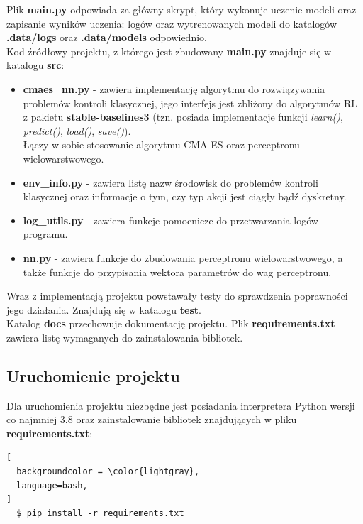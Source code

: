 \documentclass[12pt,a4paper]{article}
\begin{document}
Plik \textbf{main.py} odpowiada za główny skrypt, który wykonuje uczenie
modeli oraz zapisanie wyników uczenia: logów oraz wytrenowanych modeli
do katalogów \textbf{.data/logs} oraz \textbf{.data/models} odpowiednio. \\

Kod źródłowy projektu, z którego jest zbudowany \textbf{main.py} znajduje się
w katalogu \textbf{src}:
\begin{itemize}
  \item \textbf{cmaes\_nn.py} - zawiera implementację algorytmu do rozwiązywania
        problemów kontroli klasycznej, jego interfejs jest zbliżony
        do algorytmów RL z pakietu \textbf{stable-baselines3}
        (tzn. posiada implementacje funkcji \emph{learn()}, \emph{predict()},
        \emph{load()}, \emph{save()}). \\
        Łączy w sobie stosowanie algorytmu CMA-ES oraz perceptronu wielowarstwowego.

  \item \textbf{env\_info.py} - zawiera listę nazw środowisk do problemów kontroli
        klasycznej oraz informacje o tym, czy typ akcji jest ciągły bądź dyskretny.

  \item \textbf{log\_utils.py} - zawiera funkcje pomocnicze do przetwarzania
        logów programu.

  \item \textbf{nn.py} - zawiera funkcje do zbudowania perceptronu
        wielowarstwowego, a także funkcje do przypisania wektora parametrów
        do wag perceptronu.
\end{itemize}

Wraz z implementacją projektu powstawały testy do sprawdzenia poprawności
jego działania. Znajdują się w katalogu \textbf{test}. \\

Katalog \textbf{docs} przechowuje dokumentację projektu.
Plik \textbf{requirements.txt} zawiera listę wymaganych do zainstalowania
bibliotek.

\subsection{Uruchomienie projektu}

Dla uruchomienia projektu niezbędne jest posiadania interpretera Python wersji co najmniej 3.8
oraz zainstalowanie bibliotek znajdujących w pliku \textbf{requirements.txt}:

\begin{lstlisting}[
  backgroundcolor = \color{lightgray},
  language=bash,
]
  $ pip install -r requirements.txt
\end{lstlisting}
\end{document}
